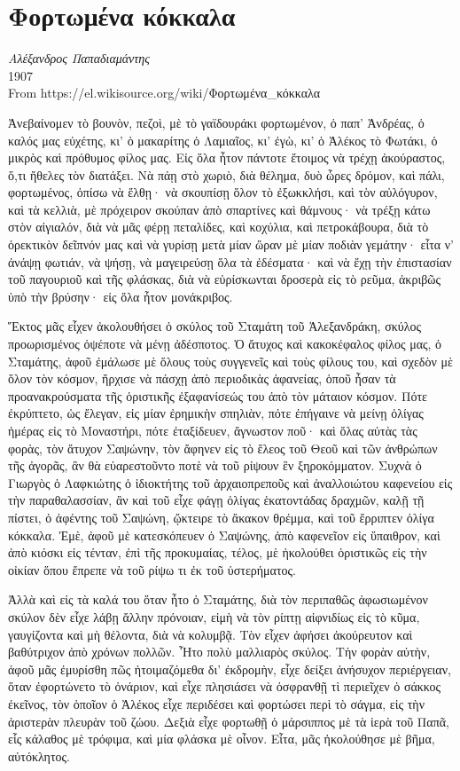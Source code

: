 \documentclass{article}
\begin{document}
\section*{Φορτωμένα κόκκαλα}

\textit{Αλέξανδρος Παπαδιαμάντης}\\
1907\\
From https://el.wikisource.org/wiki/Φορτωμένα\_κόκκαλα

\begin{multicols}{3}

Ἀνεβαίνομεν τὸ βουνὸν, πεζοὶ, μὲ τὸ γαϊδουράκι φορτωμένον, ὁ παπ’
Ἀνδρέας, ὁ καλός μας εὐχέτης, κι’ ὁ μακαρίτης ὁ Λαμιαῖος, κι’ ἐγὼ, κι’
ὁ Ἀλέκος τὸ Φωτάκι, ὁ μικρὸς καὶ πρόθυμος φίλος μας. Εἰς ὅλα ἦτον
πάντοτε ἕτοιμος νὰ τρέχῃ ἀκούραστος, ὅ,τι ἤθελες τὸν διατάξει. Νὰ πάῃ
στὸ χωριὸ, διὰ θέλημα, δυὸ ὧρες δρόμον, καὶ πάλι, φορτωμένος, ὀπίσω νὰ
ἔλθῃ· νὰ σκουπίσῃ ὅλον τὸ ἐξωκκλήσι, καὶ τὸν αὐλόγυρον, καὶ τὰ κελλιὰ,
μὲ πρόχειρον σκούπαν ἀπὸ σπαρτίνες καὶ θάμνους· νὰ τρέξῃ κάτω στὸν
αἰγιαλόν, διὰ νὰ μᾶς φέρῃ πεταλίδες, καὶ κοχύλια, καὶ πετροκάβουρα, διὰ
τὸ ὀρεκτικὸν δεῖπνόν μας καὶ νὰ γυρίσῃ μετὰ μίαν ὥραν μὲ μίαν ποδιὰν
γεμάτην· εἶτα ν’ ἀνάψῃ φωτιάν, νὰ ψήσῃ, νὰ μαγειρεύσῃ ὅλα τὰ ἐδέσματα·
καὶ νὰ ἔχῃ τὴν ἐπιστασίαν τοῦ παγουριοῦ καὶ τῆς φλάσκας, διὰ νὰ
εὑρίσκωνται δροσερὰ εἰς τὸ ρεῦμα, ἀκριβῶς ὑπὸ τὴν βρύσην· εἰς ὅλα ἦτον
μονάκριβος.

Ἕκτος μᾶς εἶχεν ἀκολουθήσει ὁ σκύλος τοῦ Σταμάτη τοῦ Ἀλεξανδράκη,
σκύλος προωρισμένος ὀψέποτε νὰ μένῃ ἀδέσποτος. Ὁ ἄτυχος καὶ κακοκέφαλος
φίλος μας, ὁ Σταμάτης, ἀφοῦ ἐμάλωσε μὲ ὅλους τοὺς συγγενεῖς καὶ τοὺς
φίλους του, καὶ σχεδὸν μὲ ὅλον τὸν κόσμον, ἤρχισε νὰ πάσχῃ ἀπὸ
περιοδικὰς ἀφανείας, ὁποῦ ἦσαν τὰ προανακρούσματα τῆς ὁριστικῆς
ἐξαφανίσεώς του ἀπὸ τὸν μάταιον κόσμον. Πότε ἐκρύπτετο, ὡς ἔλεγαν, εἰς
μίαν ἐρημικὴν σπηλιὰν, πότε ἐπήγαινε νὰ μείνῃ ὀλίγας ἡμέρας εἰς τὸ
Μοναστήρι, πότε ἐταξίδευεν, ἄγνωστον ποῦ· καὶ ὅλας αὐτὰς τὰς φορὰς, τὸν
ἄτυχον Σαψώνην, τὸν ἄφηνεν εἰς τὸ ἔλεος τοῦ Θεοῦ καὶ τῶν ἀνθρώπων τῆς
ἀγορᾶς, ἂν θὰ εὐαρεστοῦντο ποτὲ νὰ τοῦ ρίψουν ἓν ξηροκόμματον. Συχνὰ ὁ
Γιωργὸς ὁ Λαφκιώτης ὁ ἰδιοκτήτης τοῦ ἀρχαιοπρεποῦς καὶ ἀναλλοιώτου
καφενείου εἰς τὴν παραθαλασσίαν, ἂν καὶ τοῦ εἶχε φάγῃ ὀλίγας
ἑκατοντάδας δραχμῶν, καλῇ τῇ πίστει, ὁ ἀφέντης τοῦ Σαψώνη, ᾤκτειρε τὸ
ἄκακον θρέμμα, καὶ τοῦ ἔρριπτεν ὀλίγα κόκκαλα. Ἐμὲ, ἀφοῦ μὲ
κατεσκόπευεν ὁ Σαψώνης, ἀπὸ καφενεῖον εἰς ὕπαιθρον, καὶ ἀπὸ κιόσκι εἰς
τένταν, ἐπὶ τῆς προκυμαίας, τέλος, μὲ ἠκολούθει ὁριστικῶς εἰς τὴν
οἰκίαν ὅπου ἔπρεπε νὰ τοῦ ρίψω τι ἐκ τοῦ ὑστερήματος.

Ἀλλὰ καὶ εἰς τὰ καλά του ὅταν ἦτο ὁ Σταμάτης, διὰ τὸν περιπαθῶς
ἀφωσιωμένον σκύλον δὲν εἶχε λάβῃ ἄλλην πρόνοιαν, εἰμὴ νὰ τὸν ρίπτῃ
αἰφνιδίως εἰς τὸ κῦμα, γαυγίζοντα καὶ μὴ θέλοντα, διὰ νὰ κολυμβᾷ. Τὸν
εἶχεν ἀφήσει ἀκούρευτον καὶ βαθύτριχον ἀπὸ χρόνων πολλῶν. Ἦτο πολὺ
μαλλιαρὸς σκύλος. Τὴν φορὰν αὐτὴν, ἀφοῦ μᾶς ἐμυρίσθη πῶς ἡτοιμαζόμεθα
δι’ ἐκδρομὴν, εἶχε δείξει ἀνήσυχον περιέργειαν, ὅταν ἐφορτώνετο τὸ
ὀνάριον, καὶ εἶχε πλησιάσει νὰ ὀσφρανθῇ τὶ περιεῖχεν ὁ σάκκος ἐκεῖνος,
τὸν ὁποῖον ὁ Ἀλέκος εἶχε περιδέσει καὶ φορτώσει περὶ τὸ σάγμα, εἰς τὴν
ἀριστερὰν πλευρὰν τοῦ ζώου. Δεξιὰ εἶχε φορτωθῇ ὁ μάρσιππος μὲ τὰ ἱερὰ
τοῦ Παπᾶ, εἷς κάλαθος μὲ τρόφιμα, καὶ μία φλάσκα μὲ οἶνον. Εἶτα, μᾶς
ἠκολούθησε μὲ βῆμα, αὐτόκλητος.
\end{multicols}
\end{document}
